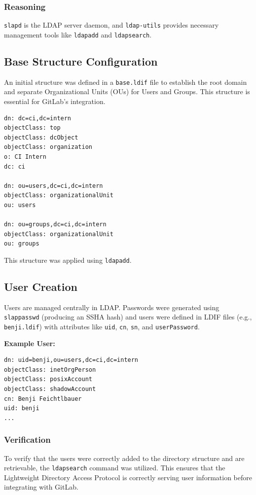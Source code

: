 \documentclass[BMR,Seminar,ngerman,IEEE]{twbook}
\begin{document}
\subsubsection{Reasoning}
\texttt{slapd} is the LDAP server daemon, and \texttt{ldap-utils} provides necessary management tools like \texttt{ldapadd} and \texttt{ldapsearch}.

\subsection{Base Structure Configuration}
An initial structure was defined in a \texttt{base.ldif} file to establish the root domain and separate Organizational Units (OUs) for Users and Groups. This structure is essential for GitLab's integration.

\begin{lstlisting}
dn: dc=ci,dc=intern
objectClass: top
objectClass: dcObject
objectClass: organization
o: CI Intern
dc: ci

dn: ou=users,dc=ci,dc=intern
objectClass: organizationalUnit
ou: users

dn: ou=groups,dc=ci,dc=intern
objectClass: organizationalUnit
ou: groups
\end{lstlisting}

This structure was applied using \texttt{ldapadd}.

\subsection{User Creation}
Users are managed centrally in LDAP. Passwords were generated using \texttt{slappasswd} (producing an SSHA hash) and users were defined in LDIF files (e.g., \texttt{benji.ldif}) with attributes like \texttt{uid}, \texttt{cn}, \texttt{sn}, and \texttt{userPassword}.

\textbf{Example User:}
\begin{verbatim}
dn: uid=benji,ou=users,dc=ci,dc=intern
objectClass: inetOrgPerson
objectClass: posixAccount
objectClass: shadowAccount
cn: Benji Feichtlbauer
uid: benji
...
\end{verbatim}

\subsubsection{Verification}
To verify that the users were correctly added to the directory structure and are retrievable, the \texttt{ldapsearch} command was utilized. This ensures that the Lightweight Directory Access Protocol is correctly serving user information before integrating with GitLab.
\end{document}
